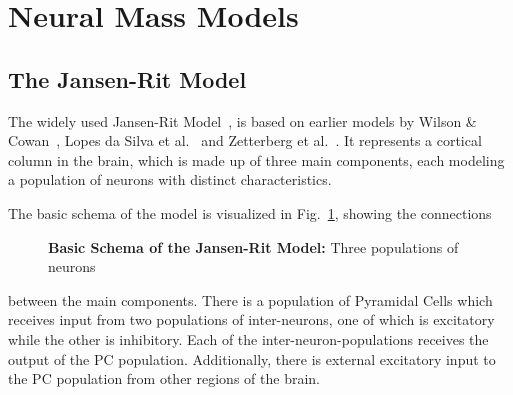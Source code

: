 \newcommand*\circled[2][black]{\tikz[baseline=(char.base)]{
    \node[scale=0.85pt,shape=circle, thin,draw=#1!60, fill=#1!5,inner sep=0.1pt] (char) {#2};}}



\section{Neural Mass Models}\label{sec:neural-mass-models}

\subsection{The Jansen-Rit Model}\label{subsec:the-jansen-rit-model}

The widely used Jansen-Rit Model~\cite{jansen_neurophysiologically-based_1993, jansen_electroencephalogram_1995},
is based on earlier models by Wilson \& Cowan~\cite{wilson_excitatory_1972},
Lopes da Silva et al.~\cite{lopes_da_silva_model_1974, lopes_da_silva_models_1976} and
Zetterberg et al.~\cite{zetterberg_performance_1978}.
It represents a cortical column in the brain, which is made up of three main components,
each modeling a population of neurons with distinct characteristics.

The basic schema of the model is visualized in Fig.~\ref{fig:Jansen Rit Flowchart}, showing the connections
\begin{figure}
    
    \caption{\textbf{Basic Schema of the Jansen-Rit Model:} Three populations of neurons}
    \label{fig:Jansen Rit Flowchart}
\end{figure}
between the main components.
There is a population of Pyramidal Cells which receives input from two populations of inter-neurons,
one of which is excitatory while the other is inhibitory.
Each of the inter-neuron-populations receives the output of the PC population.
Additionally, there is external excitatory input to the PC population from other regions of the brain.

